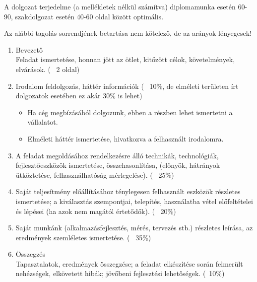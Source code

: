 A dolgozat terjedelme (a mellékletek nélkül számítva) diplomamunka esetén 60-90, szakdolgozat esetén 40-60 oldal között optimális.

Az alábbi tagolás sorrendjének betartása nem kötelező, de az arányok lényegesek!
\begin{enumerate}
	\item Bevezető\\
Feladat ismertetése, honnan jött az ötlet, kitőzött célok, követelmények, elvárások. (~ 2 oldal)
	\item Irodalom feldolgozás, háttér információk (~ 10\%, de elméleti területen írt dolgozatok esetében ez akár 30\% is lehet)
	\begin{itemize}
		\item Ha cég megbízásából dolgozunk, ebben a részben lehet ismertetni a vállalatot. 
		\item Elméleti háttér ismertetése, hivatkozva a felhasznált irodalomra. 
	\end{itemize}
	\item A feladat megoldásához rendelkezésre álló technikák, technológiák, fejlesztőeszközök ismertetése, összehasonlítása, (előnyök, hátrányok ütköztetése, felhasználhatóság mérlegelése). (~ 25\%)
	\item Saját teljesítmény előállításához ténylegesen felhasznált eszközök részletes ismertetése; a kiválasztás szempontjai, telepítés, használatba vétel előfeltételei és lépései (ha azok nem magától értetődők). (~ 20\%)
	\item Saját munkánk (alkalmazásfejlesztés, mérés, tervezés stb.) részletes leírása, az eredmények szemléletes ismertetése. (~ 35\%)
	\item Összegzés\\ Tapasztalatok, eredmények összegzése; a feladat elkészítése során felmerült nehézségek, elkövetett hibák; jövőbeni fejlesztési lehetőségek. (~10\%)
\end{enumerate}
